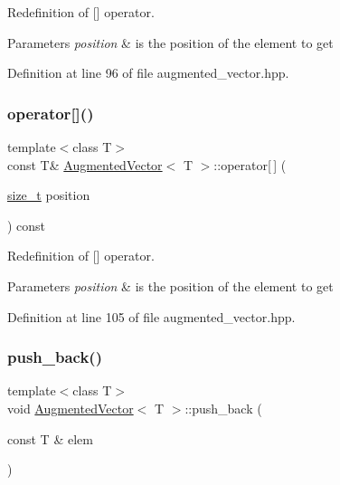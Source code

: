 Redefinition of \mbox{[}\mbox{]} operator. 


\begin{DoxyParams}{Parameters}
{\em position} & is the position of the element to get \\
\hline
\end{DoxyParams}


Definition at line 96 of file augmented\+\_\+vector.\+hpp.

\mbox{\label{classAugmentedVector_af4e37b31234b578d627e5d6d2a25a23b}} 
\subsubsection{\texorpdfstring{operator[]()}{operator[]()}\hspace{0.1cm}{\footnotesize\ttfamily [2/2]}}
{\footnotesize\ttfamily template$<$class T$>$ \\
const T\& \hyperlink{classAugmentedVector}{Augmented\+Vector}$<$ T $>$\+::operator\mbox{[}$\,$\mbox{]} (\begin{DoxyParamCaption}\item[{\hyperlink{tutorial__fpt__2017_2intro_2sixth_2test_8c_a7c94ea6f8948649f8d181ae55911eeaf}{size\+\_\+t}}]{position }\end{DoxyParamCaption}) const\hspace{0.3cm}{\ttfamily [inline]}}



Redefinition of \mbox{[}\mbox{]} operator. 


\begin{DoxyParams}{Parameters}
{\em position} & is the position of the element to get \\
\hline
\end{DoxyParams}


Definition at line 105 of file augmented\+\_\+vector.\+hpp.

\mbox{\label{classAugmentedVector_a0c04e9a119c8eac9da49f7e5b010da94}} 
\subsubsection{\texorpdfstring{push\+\_\+back()}{push\_back()}}
{\footnotesize\ttfamily template$<$class T$>$ \\
void \hyperlink{classAugmentedVector}{Augmented\+Vector}$<$ T $>$\+::push\+\_\+back (\begin{DoxyParamCaption}\item[{const T \&}]{elem }\end{DoxyParamCaption})\hspace{0.3cm}{\ttfamily [inline]}}



